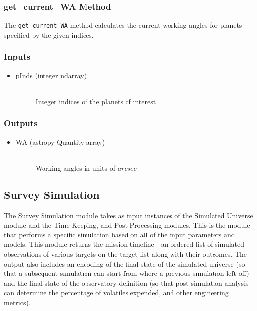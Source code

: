 \documentclass[cleanfoot]{asme2ej}
\begin{document}
\subsubsection{get\_current\_WA Method} \label{sec:getcurrentWAtask}
The \verb+get_current_WA+ method calculates the current working angles for planets specified by the given indices.

\subsubsection*{Inputs}
\begin{itemize}
    \item 
    \begin{description}
        \item[pInds (integer ndarray)] \hfill \\
        Integer indices of the planets of interest
    \end{description}
\end{itemize}
\subsubsection*{Outputs}
\begin{itemize}
    \item 
    \begin{description}
        \item[WA (astropy Quantity array)] \hfill \\
        Working angles in units of $ arcsec $
    \end{description}
\end{itemize}


\subsection{Survey Simulation} \label{sec:surveysim}
The Survey Simulation module takes as input instances of the Simulated Universe  module and the Time Keeping, and Post-Processing modules. This is the module that performs a specific simulation based on all of the input parameters and models. This module returns the mission timeline - an ordered list of simulated observations of various targets on the target list along with their outcomes.  The output also includes an encoding of the final state of the simulated universe (so that a subsequent simulation can start from where a previous simulation left off) and the final state of the observatory definition (so that post-simulation analysis can determine the percentage of volatiles expended, and other engineering metrics).
\end{document}
